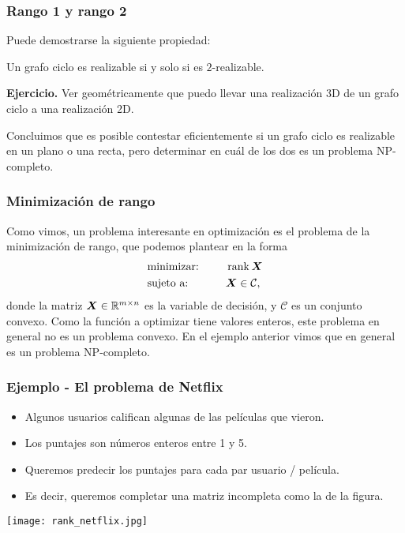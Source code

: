 \documentclass[aspectratio=169,12pt,spanish]{beamer}
\begin{document}
\begin{frame}
\frametitle{Rango 1 y rango 2}

Puede demostrarse la siguiente propiedad:

\begin{center}
Un grafo ciclo es realizable si y solo si es $2$-realizable.
\end{center}

\textbf{Ejercicio.} Ver geométricamente que puedo llevar una realización 3D de un grafo ciclo a una realización 2D.

Concluimos que es posible contestar eficientemente si un grafo ciclo es realizable en un plano o una recta, pero determinar en cuál de los dos es un problema NP-completo.

\end{frame}


\begin{frame}
\frametitle{Minimización de rango}

Como vimos, un problema interesante en optimización es el problema de la minimización de rango, que podemos plantear en la forma
\begin{alignat*}{2}
  & \text{minimizar: } & & \operatorname{rank} \bm{X}  \\
   & \text{sujeto a: } & \quad & \bm{X}  \in \mathcal{C},
\end{alignat*}
donde la matriz $\bm{X} \in \mathbb{R}^{m \times n}$ es la variable de decisión, y $\mathcal{C}$ es un conjunto convexo. Como la función a optimizar tiene valores enteros, este problema en general no es un problema convexo. En el ejemplo anterior vimos que en general es un problema NP-completo.

\end{frame}


\begin{frame}
\frametitle{Ejemplo - El problema de Netflix}

\begin{minipage}[t]{0.65\textwidth}
\begin{itemize}
\item Algunos usuarios califican algunas de las películas que vieron.
\item Los puntajes son números enteros entre 1 y 5.
\item Queremos predecir los puntajes para cada par usuario / película.
\item Es decir, queremos completar una matriz incompleta como la de la figura.
\end{itemize}
\end{minipage}
\begin{minipage}[t]{0.3\textwidth}
\begin{center}
\texttt{[image: rank\_netflix.jpg]}
\end{center}
\end{minipage}



\end{frame}
\end{document}
